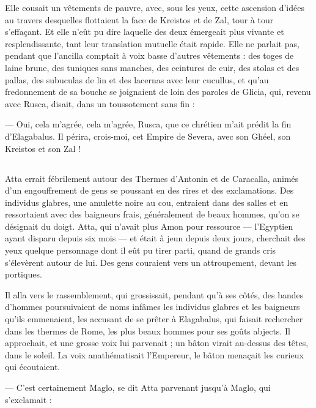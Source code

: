 \documentclass[a4paper, 11pt, oneside, polutonikogreek, french]{article}
\begin{document}
Elle cousait un vêtements de pauvre, avec, sous les yeux, cette ascension d'idées au travers desquelles flottaient la face de Kreistos et de Zal, tour à tour s'effaçant. Et elle n'eût pu dire laquelle des deux émergeait plus vivante et resplendissante, tant leur translation mutuelle était rapide. Elle ne parlait pas, pendant que l'ancilla comptait à voix basse d'autres vêtements : des toges de laine brune, des tuniques sans manches, des ceintures de cuir, des stolas et des pallas, des subuculas de lin et des lacernas avec leur cucullus, et qu'au fredonnement de sa bouche se joignaient de loin des paroles de Glicia, qui, revenu avec Rusca, disait, dans un toussotement sans fin :

--- Oui, cela m'agrée, cela m'agrée, Rusca, que ce chrétien m'ait prédit la fin d'Elagabalus. Il périra, crois-moi, cet Empire de Severa, avec son Ghéel, son Kreistos et son Zal !
\clearpage
\subsection{}
\paragraph{}
Atta errait fébrilement autour des Thermes d'Antonin et de Caracalla, animés d'un engouffrement de gens se poussant en des rires et des exclamations. Des individus glabres, une amulette noire au cou, entraient dans des salles et en ressortaient avec des baigneurs frais, généralement de beaux hommes, qu'on se désignait du doigt. Atta, qui n'avait plus Amon pour ressource --- l'Egyptien ayant disparu depuis six mois --- et était à jeun depuis deux jours, cherchait des yeux quelque personnage dont il eût pu tirer parti, quand de grands cris s'élevèrent autour de lui. Des gens couraient vers un attroupement, devant les portiques.

Il alla vers le rassemblement, qui grossissait, pendant qu'à ses côtés, des bandes d'hommes poursuivaient de noms infâmes les individus glabres et les baigneurs qu'ils emmenaient, les accusant de se prêter à Elagabalus, qui faisait rechercher dans les thermes de Rome, les plus beaux hommes pour ses goûts abjects. Il approchait, et une grosse voix lui parvenait ; un bâton virait au-dessus des têtes, dans le soleil. La voix anathématisait l'Empereur, le bâton menaçait les curieux qui écoutaient.

--- C'est certainement Maglo, se dit Atta parvenant jusqu'à Maglo, qui s'exclamait :
\end{document}
